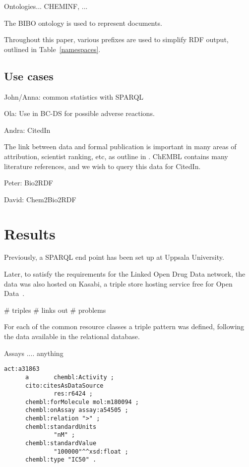 \documentclass[sw]{iosart2c}
\begin{document}
Ontologies... CHEMINF, ...

The BIBO ontology is used to represent documents.

Throughout this paper, various prefixes are used to simplify RDF output, outlined
in Table~\ref{namespaces}.

\subsection{Use cases}

John/Anna: common statistics with SPARQL

Ola: Use in BC-DS for possible adverse reactions.

Andra: CitedIn

The link between data and formal publication is important in many areas of
attribution, scientist ranking, etc, as outline in \cite{Waagmeester2012}.
ChEMBL contains many literature references, and we wish to query this data
for CitedIn.

Peter: Bio2RDF

David: Chem2Bio2RDF

\section{Results}\label{s3}

Previously, a SPARQL end point has been set up at Uppsala University.

Later, to satisfy the requirements for the Linked Open Drug Data \cite{}
network, the data was also hosted on Kasabi, a triple store hosting service
free for Open Data~\cite{}.

\# triples
\# links out
\# problems

For each of the common resource classes a triple pattern was defined, following the
data available in the relational database.

Assays .... anything

\begin{small}
\begin{verbatim}
act:a31863
      a       chembl:Activity ;
      cito:citesAsDataSource
              res:r6424 ;
      chembl:forMolecule mol:m180094 ;
      chembl:onAssay assay:a54505 ;
      chembl:relation ">" ;
      chembl:standardUnits
              "nM" ;
      chembl:standardValue
              "100000"^^xsd:float ;
      chembl:type "IC50" .
\end{verbatim}
\end{small}
\end{document}
